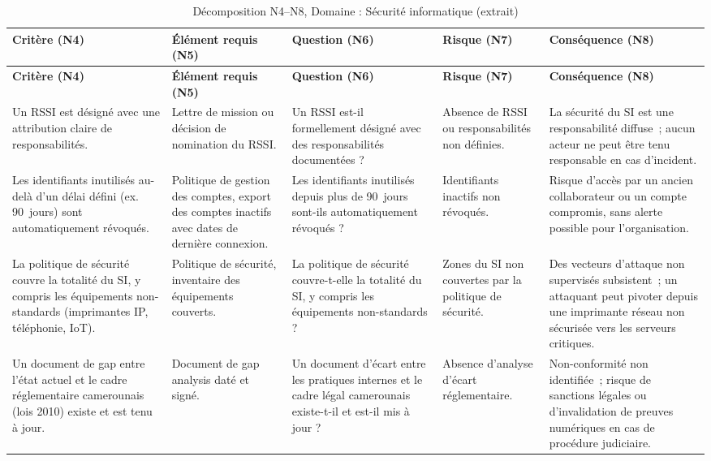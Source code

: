 \begin{longtable}{p{3.2cm}p{3cm}p{2.8cm}p{2.6cm}p{2.8cm}}
\caption{Décomposition N4--N8, Domaine : Sécurité informatique (extrait)} \\
\toprule
\textbf{Critère (N4)} & \textbf{Élément requis (N5)} & \textbf{Question (N6)} & \textbf{Risque (N7)} & \textbf{Conséquence (N8)} \\
\midrule
\endfirsthead
\toprule
\textbf{Critère (N4)} & \textbf{Élément requis (N5)} & \textbf{Question (N6)} & \textbf{Risque (N7)} & \textbf{Conséquence (N8)} \\
\midrule
\endhead
\bottomrule
\endlastfoot

Un RSSI est désigné avec une attribution claire de responsabilités. &
Lettre de mission ou décision de nomination du RSSI. &
Un RSSI est-il formellement désigné avec des responsabilités documentées ? &
Absence de RSSI ou responsabilités non définies. &
La sécurité du SI est une responsabilité diffuse~; aucun acteur ne peut être tenu responsable en cas d'incident. \\
\addlinespace

Les identifiants inutilisés au-delà d'un délai défini (ex. 90~jours) sont automatiquement révoqués. &
Politique de gestion des comptes, export des comptes inactifs avec dates de dernière connexion. &
Les identifiants inutilisés depuis plus de 90~jours sont-ils automatiquement révoqués ? &
Identifiants inactifs non révoqués. &
Risque d'accès par un ancien collaborateur ou un compte compromis, sans alerte possible pour l'organisation. \\
\addlinespace

La politique de sécurité couvre la totalité du SI, y compris les équipements non-standards (imprimantes IP, téléphonie, IoT). &
Politique de sécurité, inventaire des équipements couverts. &
La politique de sécurité couvre-t-elle la totalité du SI, y compris les équipements non-standards ? &
Zones du SI non couvertes par la politique de sécurité. &
Des vecteurs d'attaque non supervisés subsistent~; un attaquant peut pivoter depuis une imprimante réseau non sécurisée vers les serveurs critiques. \\
\addlinespace

Un document de gap entre l'état actuel et le cadre réglementaire camerounais (lois 2010) existe et est tenu à jour. &
Document de gap analysis daté et signé. &
Un document d'écart entre les pratiques internes et le cadre légal camerounais existe-t-il et est-il mis à jour ? &
Absence d'analyse d'écart réglementaire. &
Non-conformité non identifiée~; risque de sanctions légales ou d'invalidation de preuves numériques en cas de procédure judiciaire. \\

\end{longtable}


